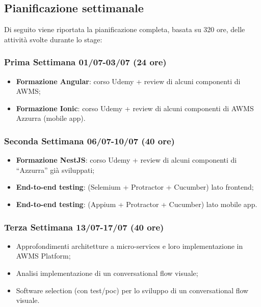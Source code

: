 \subsection{Pianificazione settimanale}
Di seguito viene riportata la pianificazione completa, basata su 320 ore, delle attività svolte durante lo stage:
\begin{trivlist}
	\item \subsubsection{Prima Settimana 01/07-03/07 (24 ore)}   
	\begin{itemize}
		\item \textbf{Formazione Angular}: corso Udemy + review di alcuni componenti di \gls{AWMS};
		\item \textbf{Formazione Ionic}: corso Udemy + review di alcuni componenti di \gls{AWMS} Azzurra (mobile app).
	\end{itemize}  

\item \subsubsection{Seconda Settimana 06/07-10/07 (40 ore)}
\begin{itemize}
	\item \textbf{Formazione NestJS}: corso Udemy + review di alcuni componenti di “Azzurra” già sviluppati;
	\item \textbf{End-to-end testing}: (Selemium + Protractor + Cucumber) lato frontend;
	\item \textbf{End-to-end testing}: (Appium + Protractor + Cucumber) lato mobile app.
\end{itemize}

\item \subsubsection{Terza Settimana 13/07-17/07 (40 ore)}
\begin{itemize}
	\item Approfondimenti architetture a micro-services e loro implementazione in \gls{AWMS} Platform;
	\item Analisi implementazione di un conversational flow visuale;
	\item Software selection (con test/poc) per lo sviluppo di un conversational flow visuale.
\end{itemize}	


\end{trivlist}
